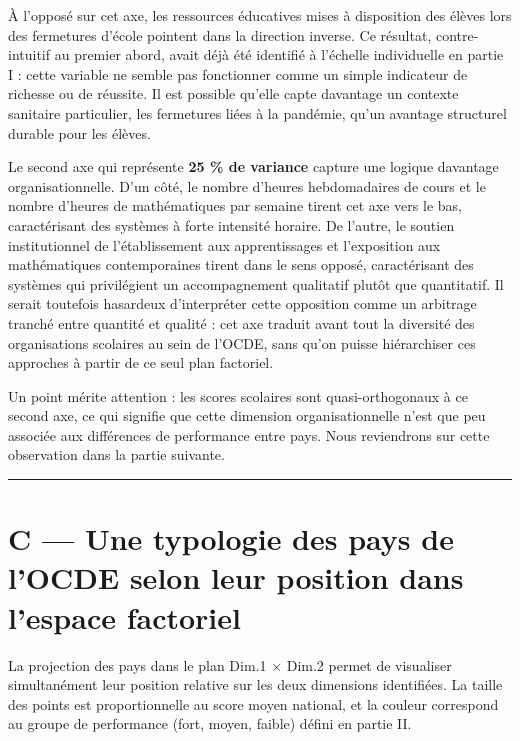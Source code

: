 \documentclass[
  french,
  11pt,
  a4paper,
]{report}
\begin{document}
À l'opposé sur cet axe, les ressources éducatives mises à disposition
des élèves lors des fermetures d'école pointent dans la direction
inverse. Ce résultat, contre-intuitif au premier abord, avait déjà été
identifié à l'échelle individuelle en partie I : cette variable ne
semble pas fonctionner comme un simple indicateur de richesse ou de
réussite. Il est possible qu'elle capte davantage un contexte sanitaire
particulier, les fermetures liées à la pandémie, qu'un avantage
structurel durable pour les élèves.

Le second axe qui représente \textbf{25 \% de variance} capture une
logique davantage organisationnelle. D'un côté, le nombre d'heures
hebdomadaires de cours et le nombre d'heures de mathématiques par
semaine tirent cet axe vers le bas, caractérisant des systèmes à forte
intensité horaire. De l'autre, le soutien institutionnel de
l'établissement aux apprentissages et l'exposition aux mathématiques
contemporaines tirent dans le sens opposé, caractérisant des systèmes
qui privilégient un accompagnement qualitatif plutôt que quantitatif. Il
serait toutefois hasardeux d'interpréter cette opposition comme un
arbitrage tranché entre quantité et qualité : cet axe traduit avant tout
la diversité des organisations scolaires au sein de l'OCDE, sans qu'on
puisse hiérarchiser ces approches à partir de ce seul plan factoriel.

Un point mérite attention : les scores scolaires sont quasi-orthogonaux
à ce second axe, ce qui signifie que cette dimension organisationnelle
n'est que peu associée aux différences de performance entre pays. Nous
reviendrons sur cette observation dans la partie suivante.

\begin{center}\rule{0.5\linewidth}{0.5pt}\end{center}

\section{C --- Une typologie des pays de l'OCDE selon leur position dans
l'espace
factoriel}\label{c-une-typologie-des-pays-de-locde-selon-leur-position-dans-lespace-factoriel}

La projection des pays dans le plan Dim.1 × Dim.2 permet de visualiser
simultanément leur position relative sur les deux dimensions
identifiées. La taille des points est proportionnelle au score moyen
national, et la couleur correspond au groupe de performance (fort,
moyen, faible) défini en partie II.
\end{document}
